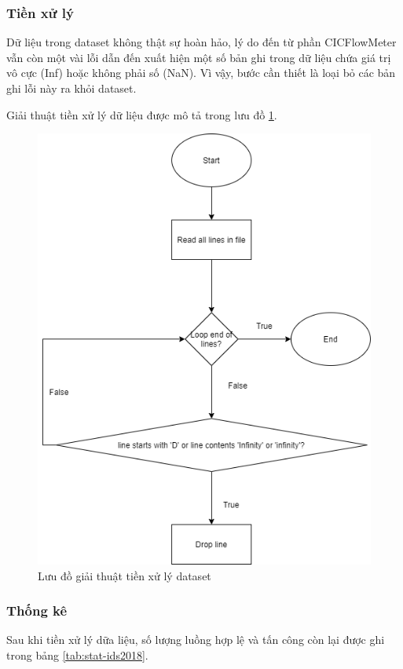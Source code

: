 \subsubsection{Tiền xử lý}

Dữ liệu trong dataset không thật sự hoàn hảo, lý do đến từ phần CICFlowMeter vẫn còn một vài lỗi dẫn đến xuất hiện một số bản ghi trong dữ liệu chứa giá trị vô cực (Inf) hoặc không phải số (NaN). Vì vậy, bước cần thiết là loại bỏ các bản ghi lỗi này ra khỏi dataset.

Giải thuật tiền xử lý dữ liệu được mô tả trong lưu đồ \ref{fig:drop-line}.

\begin{figure}[ht!]
	\centering
	\includegraphics[width=0.75\linewidth]{fig/drop-line.png}
	\caption{Lưu đồ giải thuật tiền xử lý dataset}
	\label{fig:drop-line}
\end{figure}

\subsubsection{Thống kê}

Sau khi tiền xử lý dữa liệu, số lượng luồng hợp lệ và tấn công còn lại được ghi trong bảng \ref{tab:stat-ids2018}.

